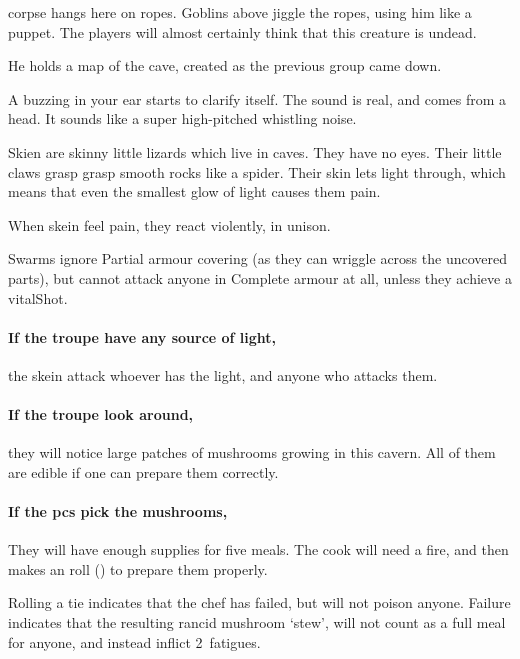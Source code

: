 \begin{multicols}{2}
 corpse hangs here on ropes.
Goblins above jiggle the ropes, using him like a puppet.
The players will almost certainly think that this creature is undead.

He holds a map of the cave, created as the previous group came down.

\begin{boxtext}
  A buzzing in your ear starts to clarify itself.
  The sound is real, and comes from a head.
  It sounds like a super high-pitched whistling noise.
\end{boxtext}


Skien are skinny little lizards which live in caves.
They have no eyes.
Their little claws grasp grasp smooth rocks like a spider.
Their skin lets light through, which means that even the smallest glow of light causes them pain.

When skein feel pain, they react violently, in unison.

\skeinSwarm

Swarms ignore Partial armour covering (as they can wriggle across the uncovered parts), but cannot attack anyone in Complete armour at all, unless they achieve a \gls{vitalShot}.%

\paragraph{If the troupe have any source of light,}
the skein attack whoever has the light, and anyone who attacks them.

\paragraph{If the troupe look around,}
they will notice large patches of mushrooms growing in this cavern.
All of them are edible if one can prepare them correctly.

\paragraph{If the \glspl{pc} pick the mushrooms,}
They will have enough supplies for five meals.
The cook will need a fire,%
and then makes an  roll (\tn[10]) to prepare them properly.

Rolling a tie indicates that the chef has failed, but will not poison anyone.
Failure indicates that the resulting rancid mushroom `stew', will not count as a full meal for anyone, and instead inflict 2~\glspl{fatigue}.


\end{multicols}
